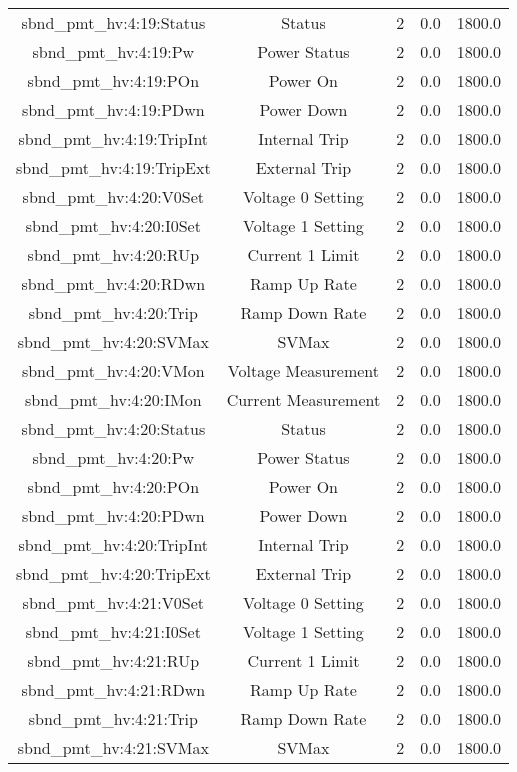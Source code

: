 \begin{center}
\begin{longtable}{c | c c c c }
sbnd\_pmt\_hv:4:19:Status & Status & 2 & 0.0 & 1800.0\\ 
sbnd\_pmt\_hv:4:19:Pw & Power Status & 2 & 0.0 & 1800.0\\ 
sbnd\_pmt\_hv:4:19:POn & Power On & 2 & 0.0 & 1800.0\\ 
sbnd\_pmt\_hv:4:19:PDwn & Power Down & 2 & 0.0 & 1800.0\\ 
sbnd\_pmt\_hv:4:19:TripInt & Internal Trip & 2 & 0.0 & 1800.0\\ 
sbnd\_pmt\_hv:4:19:TripExt & External Trip & 2 & 0.0 & 1800.0\\ 
sbnd\_pmt\_hv:4:20:V0Set & Voltage 0 Setting & 2 & 0.0 & 1800.0\\ 
sbnd\_pmt\_hv:4:20:I0Set & Voltage 1 Setting & 2 & 0.0 & 1800.0\\ 
sbnd\_pmt\_hv:4:20:RUp & Current 1 Limit & 2 & 0.0 & 1800.0\\ 
sbnd\_pmt\_hv:4:20:RDwn & Ramp Up Rate & 2 & 0.0 & 1800.0\\ 
sbnd\_pmt\_hv:4:20:Trip & Ramp Down Rate & 2 & 0.0 & 1800.0\\ 
sbnd\_pmt\_hv:4:20:SVMax & SVMax & 2 & 0.0 & 1800.0\\ 
sbnd\_pmt\_hv:4:20:VMon & Voltage Measurement & 2 & 0.0 & 1800.0\\ 
sbnd\_pmt\_hv:4:20:IMon & Current Measurement & 2 & 0.0 & 1800.0\\ 
sbnd\_pmt\_hv:4:20:Status & Status & 2 & 0.0 & 1800.0\\ 
sbnd\_pmt\_hv:4:20:Pw & Power Status & 2 & 0.0 & 1800.0\\ 
sbnd\_pmt\_hv:4:20:POn & Power On & 2 & 0.0 & 1800.0\\ 
sbnd\_pmt\_hv:4:20:PDwn & Power Down & 2 & 0.0 & 1800.0\\ 
sbnd\_pmt\_hv:4:20:TripInt & Internal Trip & 2 & 0.0 & 1800.0\\ 
sbnd\_pmt\_hv:4:20:TripExt & External Trip & 2 & 0.0 & 1800.0\\ 
sbnd\_pmt\_hv:4:21:V0Set & Voltage 0 Setting & 2 & 0.0 & 1800.0\\ 
sbnd\_pmt\_hv:4:21:I0Set & Voltage 1 Setting & 2 & 0.0 & 1800.0\\ 
sbnd\_pmt\_hv:4:21:RUp & Current 1 Limit & 2 & 0.0 & 1800.0\\ 
sbnd\_pmt\_hv:4:21:RDwn & Ramp Up Rate & 2 & 0.0 & 1800.0\\ 
sbnd\_pmt\_hv:4:21:Trip & Ramp Down Rate & 2 & 0.0 & 1800.0\\ 
sbnd\_pmt\_hv:4:21:SVMax & SVMax & 2 & 0.0 & 1800.0\\ 

\end{longtable}
\end{center}
